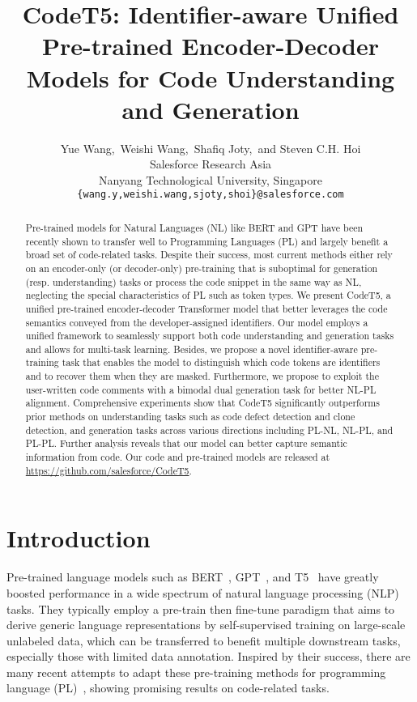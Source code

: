 \documentclass[11pt]{article}
\title{CodeT5: Identifier-aware Unified Pre-trained Encoder-Decoder Models for Code Understanding and Generation}
\author{Yue Wang,~Weishi Wang,~Shafiq Joty,~and Steven C.H. Hoi\\
 Salesforce Research Asia \\
 Nanyang Technological University, Singapore\\
\texttt{\{wang.y,weishi.wang,sjoty,shoi\}@salesforce.com}\\}
\begin{document}
\maketitle
\begin{abstract}
Pre-trained models for Natural Languages (NL) like BERT and GPT have been recently shown to transfer well to Programming Languages (PL) and largely benefit a broad set of code-related tasks. Despite their success, most current methods either rely on an encoder-only (or decoder-only) pre-training that is suboptimal for generation (resp. understanding) tasks or process the code snippet in the same way as NL, neglecting the special characteristics of PL such as token types. We present CodeT5, a unified pre-trained encoder-decoder Transformer model that better leverages the code semantics conveyed from the developer-assigned identifiers. Our model employs a unified framework to seamlessly support both code understanding and generation tasks and allows for multi-task learning. Besides, we propose a novel identifier-aware pre-training task that enables the model to distinguish which code tokens are identifiers and to recover them when they are masked. Furthermore, we propose to exploit the user-written code comments with a bimodal dual generation task for better NL-PL alignment.
Comprehensive experiments show that CodeT5 significantly outperforms prior methods on understanding tasks such as code defect detection and clone detection, and generation tasks across various directions including PL-NL, NL-PL, and PL-PL. Further analysis reveals that our model can better capture semantic information from code.  Our code and pre-trained models are released at \url{https://github.com/salesforce/CodeT5}.
\end{abstract}
 \section{Introduction}
Pre-trained language models such as 
BERT~\cite{DBLP:conf/naacl/DevlinCLT19}, GPT~\cite{radford2019language}, and T5~\cite{DBLP:journals/jmlr/RaffelSRLNMZLL20} have greatly boosted  performance  in a wide spectrum of natural language processing (NLP) tasks. They typically employ a pre-train then fine-tune paradigm that aims to derive generic language representations by self-supervised training on large-scale unlabeled data, which can be transferred to benefit multiple downstream tasks, especially those with limited data annotation.
Inspired by their success, there are many recent attempts to adapt these pre-training methods for programming language (PL)~\cite{DBLP:conf/sigsoft/SvyatkovskiyDFS20,DBLP:conf/icml/KanadeMBS20,DBLP:conf/emnlp/FengGTDFGS0LJZ20}, showing promising results on  code-related tasks.
\end{document}
